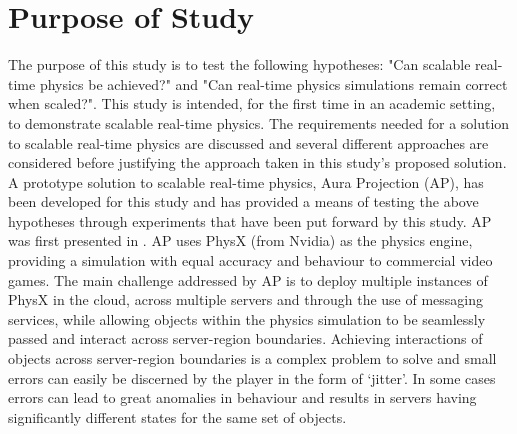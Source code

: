 \section{Purpose of Study}
The purpose of this study is to test the following hypotheses: "Can scalable real-time physics be achieved?" and "Can real-time physics simulations remain correct when scaled?". This study is intended, for the first time in an academic setting, to demonstrate scalable real-time physics. 
The requirements needed for a solution to scalable real-time physics are discussed and several different approaches are considered before justifying the approach taken in this study's proposed solution. 
A prototype solution to scalable real-time physics, Aura Projection (AP), has been developed for this study and has provided a means of testing the above hypotheses through experiments that have been put forward by this study. AP was first presented in \cite{brown2019aura}.
AP uses PhysX \cite{PhysX} (from Nvidia) as the physics engine, providing a simulation with equal accuracy and behaviour to commercial video games. The main challenge addressed by AP is to deploy multiple instances of PhysX in the cloud, across multiple servers and through the use of messaging services, while allowing objects within the physics simulation to be seamlessly passed and interact across server-region boundaries. Achieving interactions of objects across server-region boundaries is a complex problem to solve and small errors can easily be discerned by the player in the form of `jitter'. In some cases errors can lead to great anomalies in behaviour and results in servers having significantly different states for the same set of objects.
\\
